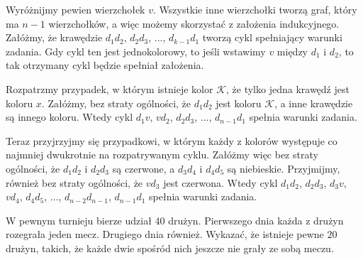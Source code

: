\vspace{5px}

\noindent
Wyróżnijmy pewien wierzchołek $v$. Wszystkie inne wierzchołki tworzą graf, który ma $n - 1$ wierzchołków, a więc możemy skorzystać z założenia indukcyjnego. Załóżmy, że krawędzie $d_1d_2$, $d_2d_3$, ..., $d_{k-1}d_1$ tworzą cykl spełniający warunki zadania. Gdy cykl ten jest jednokolorowy, to jeśli wstawimy $v$ między $d_1$ i $d_2$, to tak otrzymany cykl będzie spełniał założenia. 

\vspace{5px}

\noindent
Rozpatrzmy przypadek, w którym istnieje kolor $\mathcal{K}$, że tylko jedna krawędź jest koloru $x$. Załóżmy, bez straty ogólności, że $d_1d_2$ jest koloru $\mathcal{K}$, a inne krawędzie są innego koloru. Wtedy cykl $d_1v$, $vd_2$, $d_2d_3$, ..., $d_{n - 1}d_1$ spełnia warunki zadania. 

\vspace{5px}

\begin{center}
\end{center}


\noindent
Teraz przyjrzyjmy się przypadkowi, w którym każdy z kolorów występuje co najmniej dwukrotnie na rozpatrywanym cyklu.
Załóżmy więc bez straty ogólności, że $d_1d_2$ i $d_2d_3$ są czerwone, a $d_3d_4$ i $d_4d_5$ są niebieskie. Przyjmijmy, również bez straty ogólności, że $vd_3$ jest czerwona. Wtedy cykl $d_1d_2$, $d_2d_3$, $d_3v$, $vd_4$, $d_4d_5$, ..., $d_{n - 2}d_{n - 1}$, $d_{n - 1}d_1$ spełnia warunki zadania.

\vspace{5px}

\begin{problem}{3}
	W pewnym turnieju bierze udział $40$ drużyn. Pierwszego dnia każda z drużyn rozegrała jeden mecz. Drugiego dnia również. Wykazać, że istnieje pewne $20$ drużyn, takich, że każde dwie spośród nich jeszcze nie grały ze sobą meczu.
\end{problem}

